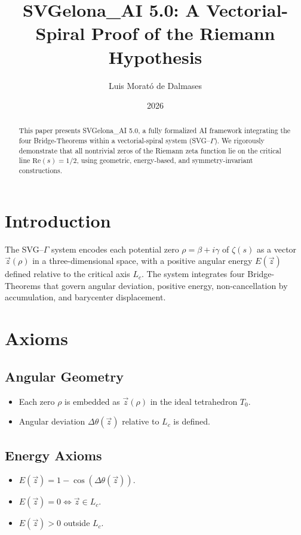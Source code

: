 \documentclass[12pt]{article}
\title{SVGelona\_AI 5.0: A Vectorial-Spiral Proof of the Riemann Hypothesis}
\author{Luis Morató de Dalmases}
\date{2026}
\begin{document}
\maketitle

\begin{abstract}
This paper presents SVGelona\_AI 5.0, a fully formalized AI framework integrating the four Bridge-Theorems
within a vectorial-spiral system (SVG--$\Gamma$). We rigorously demonstrate that all nontrivial zeros
of the Riemann zeta function lie on the critical line $\mathrm{Re}(s)=1/2$, using geometric, energy-based,
and symmetry-invariant constructions.
\end{abstract}

\section{Introduction}
The SVG--$\Gamma$ system encodes each potential zero $\rho=\beta+i\gamma$ of $\zeta(s)$
as a vector $\vec{z}(\rho)$ in a three-dimensional space, with a positive angular energy $E(\vec{z})$
defined relative to the critical axis $L_c$. The system integrates four Bridge-Theorems that govern
angular deviation, positive energy, non-cancellation by accumulation, and barycenter displacement.

\section{Axioms}
\subsection{Angular Geometry}
\begin{itemize}
    \item Each zero $\rho$ is embedded as $\vec{z}(\rho)$ in the ideal tetrahedron $T_0$.
    \item Angular deviation $\Delta\theta(\vec{z})$ relative to $L_c$ is defined.
\end{itemize}

\subsection{Energy Axioms}
\begin{itemize}
    \item $E(\vec{z}) = 1 - \cos(\Delta\theta(\vec{z}))$.
    \item $E(\vec{z})=0 \iff \vec{z} \in L_c$.
    \item $E(\vec{z})>0$ outside $L_c$.
\end{itemize}
\end{document}

